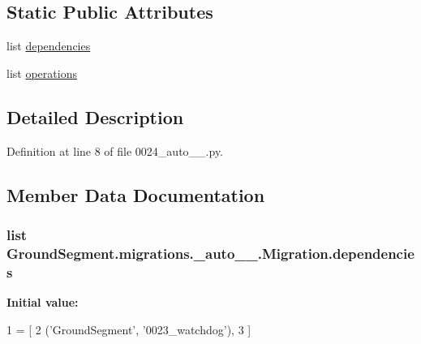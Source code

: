 \subsection*{Static Public Attributes}
\begin{DoxyCompactItemize}
\item 
list \hyperlink{class_ground_segment_1_1migrations_1_10024__auto__20161204__1335_1_1_migration_a57dd9e9036e9b0e19b323c669e9d4cc7}{dependencies}
\item 
list \hyperlink{class_ground_segment_1_1migrations_1_10024__auto__20161204__1335_1_1_migration_a1303507a1f53404d856b7e8d81629c8d}{operations}
\end{DoxyCompactItemize}


\subsection{Detailed Description}


Definition at line 8 of file 0024\+\_\+auto\+\_\+\_.\+py.



\subsection{Member Data Documentation}
\hypertarget{class_ground_segment_1_1migrations_1_10024__auto__20161204__1335_1_1_migration_a57dd9e9036e9b0e19b323c669e9d4cc7}{}
\subsubsection[{dependencies}]{\setlength{\rightskip}{0pt plus 5cm}list Ground\+Segment.\+migrations.\+\_\+auto\+\_\+\_.\+Migration.\+dependencies\hspace{0.3cm}{\ttfamily [static]}}\label{class_ground_segment_1_1migrations_1_10024__auto__20161204__1335_1_1_migration_a57dd9e9036e9b0e19b323c669e9d4cc7}
{\bfseries Initial value\+:}
\begin{DoxyCode}
1 = [
2         (\textcolor{stringliteral}{'GroundSegment'}, \textcolor{stringliteral}{'0023\_watchdog'}),
3     ]
\end{DoxyCode}


